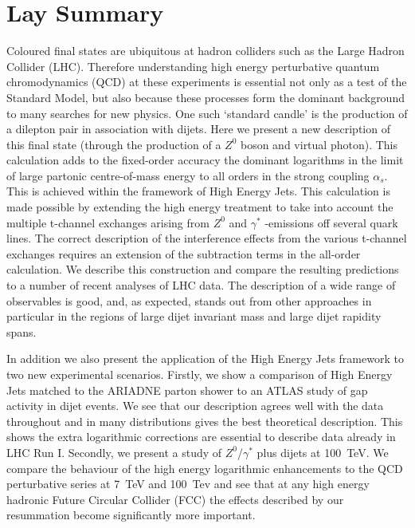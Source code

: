\chapter*{Lay Summary}
\noindent

Coloured final states are ubiquitous at hadron colliders such as the Large Hadron Collider (LHC). Therefore understanding high energy perturbative quantum chromodynamics (QCD) at these experiments is essential not only as a test of the Standard Model, but also because these processes form the dominant background to many searches for new physics.  One such `standard candle' is the production of a dilepton pair in association with dijets.  Here we present a new description of this final state (through the production of a $Z^0$ boson and virtual photon).  This calculation adds to the fixed-order accuracy the dominant logarithms in the limit of large partonic centre-of-mass energy to all orders in the strong coupling $\alpha_s$.  This is achieved within the framework of High Energy Jets.  This calculation is made possible by extending the high energy treatment to take into account the multiple t-channel exchanges arising from $Z^0$ and $\gamma^*$ -emissions off several quark lines. The correct description of the interference effects from the various t-channel exchanges requires an extension of the subtraction terms in the all-order calculation.  We describe this construction and compare the resulting predictions to a number of recent analyses of LHC data. The description of a wide range of observables is good, and, as expected, stands out from other approaches in particular in the regions of large dijet invariant mass and large dijet rapidity spans.

In addition we also present the application of the High Energy Jets framework to two new experimental scenarios.  Firstly, we show a comparison of High Energy Jets matched to the ARIADNE parton shower to an ATLAS study of gap activity in dijet events. We see that our description agrees well with the data throughout and in many distributions gives the best theoretical description.  This shows the extra logarithmic corrections are essential to describe data already in LHC Run I.  Secondly, we present a study of $Z^0$/$\gamma^*$ plus dijets at 100~TeV.  We compare the behaviour of the high energy logarithmic enhancements to the QCD perturbative series at 7~TeV and 100~Tev and see that at any high energy hadronic Future Circular Collider (FCC) the effects described by our resummation become significantly more important.



